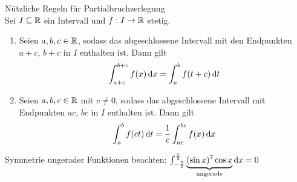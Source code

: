 \begin{corollary}{Nützliche Regeln für Partialbruchzerlegung}\\
	Sei $I \subseteq \mathbb{R}$ ein Intervall und $f: I \to \mathbb{R}$ stetig.
	\begin{enumerate}
		\item Seien $a,b,c \in \mathbb{R}$, sodass das abgeschlossene Intervall mit den Endpunkten $a+c$, $b+c$ in $I$ enthalten ist.
			Dann gilt
			\begin{equation*}
				\int_{a+c}^{b+c} f(x) \dif x = \int_{a}^{b} f(t+c) \dif t
			\end{equation*}
		\item Seien $a,b,c \in \mathbb{R}$ mit $c \neq 0$, sodass das abgeschlossene Intervall mit Endpunkten $ac$, $bc$ in $I$ enthalten ist.
			Dann gilt
			\begin{equation*}
				\int_{a}^{b} f(ct) \dif t = \frac{1}{c} \int_{ac}^{bc} f(x) \dif x
			\end{equation*}
	\end{enumerate}
\end{corollary}
Symmetrie ungerader Funktionen beachten:
$\int_{-\frac{\pi}{2}}^{\frac{\pi}{2}} \underbrace{(\sin x)^7 \cos x}_{\text{ungerade}} \dif x = 0$



